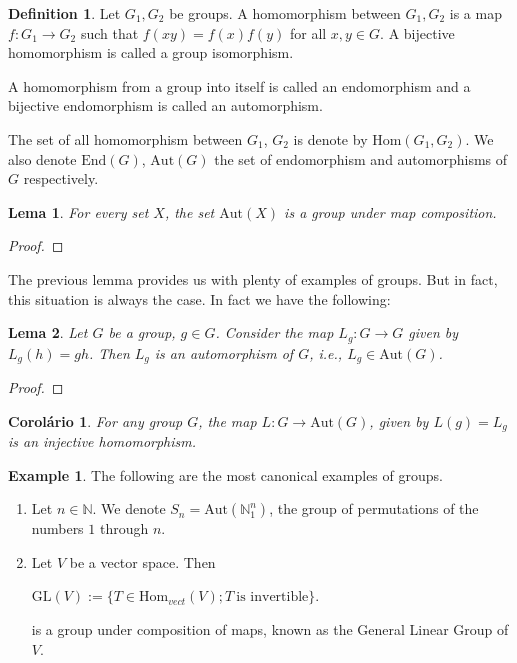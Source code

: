 \documentclass[]{article}
\newtheorem{lemma}{Lema}[section]
\newtheorem{coro}{Corolário}[section]
\theoremstyle{definition}
\newtheorem{definition}{Definition}[section]
\theoremstyle{definition}
\newtheorem{exmp}{Example}[section]
\newcommand{\raw}{\rightarrow}
\newcommand{\ie}{\textit{i.e.}}
\begin{document}
	\begin{definition}
		Let $G_1, G_2$ be groups. A homomorphism between $G_1, G_2$ is a map $f:G_1 \raw G_2$ such that $f(xy)=f(x)f(y)$ for all $x,y \in G$. A bijective homomorphism is called a group isomorphism. 
		
		A homomorphism from a group into itself is called an endomorphism and a bijective endomorphism is called an automorphism. 
		
		The set of all homomorphism between $G_1$, $G_2$ is denote by $\text{Hom}(G_1, G_2)$. We also denote $\text{End}(G)$, $\text{Aut}(G)$ the set of endomorphism and automorphisms of $G$ respectively.
	\end{definition}
	
	\begin{lemma}
		For every set $X$, the set $\text{Aut}(X)$ is a group under map composition.
	\end{lemma}
	
	\begin{proof}
		
		
	\end{proof}
	
	The previous lemma provides us with plenty of examples of groups. But in fact, this situation is always the case. In fact we have the following:
	
	\begin{lemma}
		Let $G$ be a group, $g \in G$. Consider the map $L_g:G \raw G$ given by $L_g(h)=gh$. Then $L_g$ is an automorphism of $G$, \ie, $L_g \in \text{Aut}(G)$.
	\end{lemma}
	
	\begin{proof}
		
	\end{proof}
	
	\begin{coro}
		For any group $G$, the map $L:G \raw \text{Aut}(G)$, given by $L(g) = L_g$ is an injective homomorphism.
	\end{coro}
	
	\begin{exmp}
		The following are the most canonical examples of groups. 
		
		\begin{enumerate}
			\item Let $n \in \mathbb{N}$. We denote $S_n = \text{Aut}(\mathbb{N}_1^n)$, the group of permutations of the numbers $1$ through $n$.
			
			\item 	Let $V$ be a vector space. Then 
			
			\begin{center}
				$\text{GL}(V) := \{T \in \text{Hom}_{vect}(V); T\  \text{is invertible} \}$.
			\end{center}
			
			\noindent is a group under composition of maps, known as the General Linear Group of $V$.			
		\end{enumerate}
	\end{exmp}
	
\end{document}
